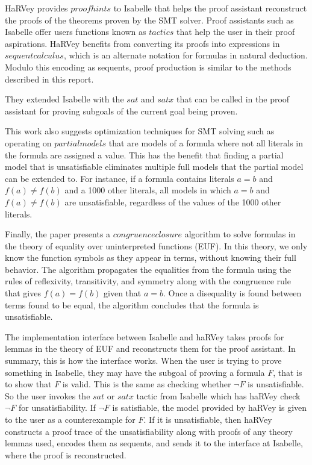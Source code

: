 \documentclass{article}
\begin{document}
HaRVey provides $proof hints$ to Isabelle that 
helps the proof assistant reconstruct the proofs 
of the theorems proven by the SMT solver. Proof 
assistants such as Isabelle offer users functions 
known as $tactics$ that help the user in their 
proof aspirations. HaRVey benefits from converting 
its proofs into expressions in $sequent calculus$, 
which is an alternate notation for formulas in 
natural deduction. Modulo this encoding as sequents, 
proof production is similar to the methods described 
in this report. 

They extended Isabelle with the $sat$ and $satx$ 
that can be called in the proof assistant for 
proving subgoals of the current goal being proven.
 
This work also suggests optimization techniques 
for SMT solving such as operating on $partial 
models$ that are models of a formula where not all 
literals in the formula are assigned a value. This has 
the benefit that finding a partial model that is 
unsatisfiable eliminates multiple full models that the 
partial model can be extended to. For instance, if 
a formula contains literals $a = b$ and 
$f(a) \neq f(b)$ and a 1000 other literals, all models 
in which $a = b$ and $f(a) \neq f(b)$ are unsatisfiable, 
regardless of the values of the 1000 other literals.

Finally, the paper presents a $congruence closure$ 
algorithm to solve formulas in the theory of 
equality over uninterpreted functions (EUF). In 
this theory, we only know the function symbols 
as they appear in terms, without knowing their 
full behavior. The algorithm propagates the equalities
from the formula using the rules of reflexivity, 
transitivity, and symmetry along with the congruence rule
that gives $f(a) = f(b)$ given that $a = b$. Once a 
disequality is found between terms found to be equal, 
the algorithm concludes that the formula is unsatisfiable.

The implementation interface between Isabelle and haRVey 
takes proofs for lemmas in the theory of EUF and 
reconstructs them for the proof assistant. In summary,
this is how the interface works. When the user is trying 
to prove something in Isabelle, they may have the 
subgoal of proving a formula $F$, that is to show that 
$F$ is valid. This is the same as checking whether 
$\neg F$ is unsatisfiable. So the user invokes the $sat$ 
or $satx$ tactic from Isabelle which has haRVey check 
$\neg F$ for unsatisfiability. If $\neg F$ is 
satisfiable, the model provided by haRVey is given 
to the user as a counterexample for $F$. 
If it is unsatisfiable, then haRVey constructs a proof
trace of the unsatisfiability along with proofs of 
any theory lemmas used, encodes them as sequents,
and sends it to the interface at Isabelle, 
where the proof is reconstructed.
\end{document}
